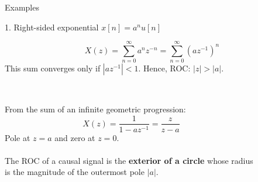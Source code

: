 \documentclass[10pt, handout]{beamer}
\begin{document}
%
\begin{frame}{Examples}

\begin{block}{1. Right-sided exponential $x[n] = a^nu[n]$}

\begin{equation*} 
X(z) = \sum_{n=0}^\infty a^nz^{-n} = \sum_{n=0}^\infty (az^{-1})^n 
\end{equation*}
This sum converges only if $|az^{-1}| < 1$. Hence, ROC: $|z| > |a|$.
~\\
~\\
\begin{columns}
	\begin{column}{0.5\textwidth}
		From the sum of an infinite geometric progression:
		\begin{equation*} 
		X(z) = \frac{1}{1-az^{-1}} = \frac{z}{z-a}
		\end{equation*}
		Pole at $z = a$ and zero at $z = 0$.
		~\\
		~\\
		The ROC of a causal signal is the \textbf{exterior of a circle} whose radius is the magnitude of the outermost pole $|a|$.
	\end{column}
	\begin{column}{0.5\textwidth}  %
		\begin{figure}
			\centering
			\resizebox{0.95\linewidth}{!}{}
			\label{fig:right_sided_exp}
		\end{figure}
	\end{column}
\end{columns}

\end{block}
\end{frame}
\end{document}
